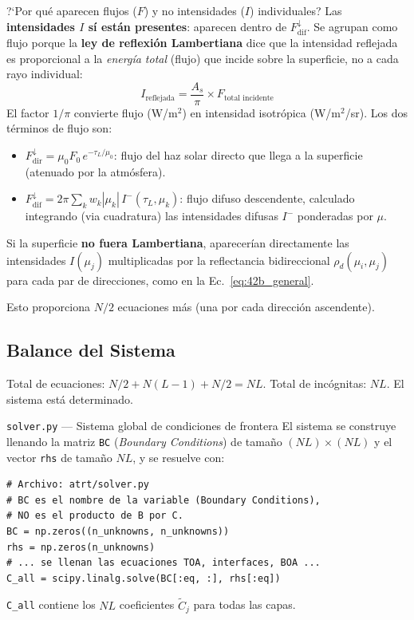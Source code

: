 \documentclass[a4paper,11pt]{article}
\begin{document}
\begin{physics}{?`Por qu\'e aparecen flujos ($F$) y no intensidades ($I$) individuales?}
Las \textbf{intensidades $I$ s\'i est\'an presentes}: aparecen dentro de $F_{\text{dif}}^{\downarrow}$.  Se agrupan como flujo porque la \textbf{ley de reflexi\'on Lambertiana} dice que la intensidad reflejada es proporcional a la \textit{energ\'ia total} (flujo) que incide sobre la superficie, no a cada rayo individual:
\begin{equation}
I_{\text{reflejada}} = \frac{A_s}{\pi} \times F_{\text{total incidente}}
\end{equation}
El factor $1/\pi$ convierte flujo (W/m$^2$) en intensidad isotr\'opica (W/m$^2$/sr). Los dos t\'erminos de flujo son:
\begin{itemize}
\item $F_{\text{dir}}^{\downarrow} = \mu_0 F_0 \, e^{-\tau_L/\mu_0}$: flujo del haz solar directo que llega a la superficie (atenuado por la atm\'osfera).
\item $F_{\text{dif}}^{\downarrow} = 2\pi \sum_k w_k |\mu_k| \, I^{-}(\tau_L, \mu_k)$: flujo difuso descendente, calculado integrando (via cuadratura) las intensidades difusas $I^{-}$ ponderadas por $\mu$.
\end{itemize}
Si la superficie \textbf{no fuera Lambertiana}, aparecer\'ian directamente las intensidades $I(\mu_j)$ multiplicadas por la reflectancia bidireccional $\rho_d(\mu_i, \mu_j)$ para cada par de direcciones, como en la Ec.~\eqref{eq:42b_general}.
\end{physics}

Esto proporciona $N/2$ ecuaciones m\'as (una por cada direcci\'on ascendente).

\subsection{Balance del Sistema}

Total de ecuaciones: $N/2 + N(L-1) + N/2 = NL$.  Total de inc\'ognitas: $NL$.  El sistema est\'a determinado.

\begin{implementation}{\texttt{solver.py} --- Sistema global de condiciones de frontera}
El sistema se construye llenando la matriz \texttt{BC} (\textit{Boundary Conditions}) de tama\~no $(NL) \times (NL)$ y el vector \texttt{rhs} de tama\~no $NL$, y se resuelve con:
\begin{lstlisting}
# Archivo: atrt/solver.py
# BC es el nombre de la variable (Boundary Conditions),
# NO es el producto de B por C.
BC = np.zeros((n_unknowns, n_unknowns))
rhs = np.zeros(n_unknowns)
# ... se llenan las ecuaciones TOA, interfaces, BOA ...
C_all = scipy.linalg.solve(BC[:eq, :], rhs[:eq])
\end{lstlisting}
\texttt{C\_all} contiene los $NL$ coeficientes $\widetilde{C}_j$ para todas las capas.
\end{implementation}
\end{document}
